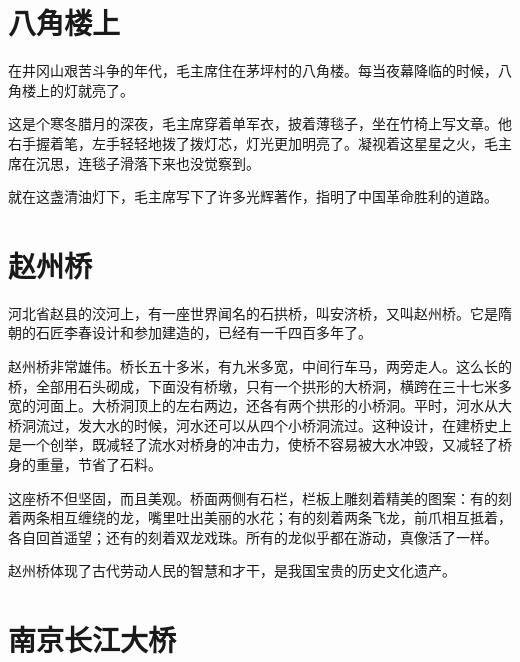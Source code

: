 \documentclass[12pt,UTF-8,openany]{ctexbook}
\begin{document}
\chapter{八角楼上}

\begin{large}
    
    在井冈山艰苦斗争的年代，毛主席住在茅坪村的八角楼。每当夜幕降临的时候，八角楼上的灯就亮了。
    
    这是个寒冬腊月的深夜，毛主席穿着单军衣，披着薄毯子，坐在竹椅上写文章。他右手握着笔，左手轻轻地拨了拨灯芯，灯光更加明亮了。凝视着这星星之火，毛主席在沉思，连毯子滑落下来也没觉察到。
    
    就在这盏清油灯下，毛主席写下了许多光辉著作，指明了中国革命胜利的道路。
    
\end{large}



\chapter{赵州桥}

\begin{large}
    
    河北省赵县的洨河上，有一座世界闻名的石拱桥，叫安济桥，又叫赵州桥。它是隋朝的石匠李春设计和参加建造的，已经有一千四百多年了。
    
    赵州桥非常雄伟。桥长五十多米，有九米多宽，中间行车马，两旁走人。这么长的桥，全部用石头砌成，下面没有桥墩，只有一个拱形的大桥洞，横跨在三十七米多宽的河面上。大桥洞顶上的左右两边，还各有两个拱形的小桥洞。平时，河水从大桥洞流过，发大水的时候，河水还可以从四个小桥洞流过。这种设计，在建桥史上是一个创举，既减轻了流水对桥身的冲击力，使桥不容易被大水冲毁，又减轻了桥身的重量，节省了石料。
    
    这座桥不但坚固，而且美观。桥面两侧有石栏，栏板上雕刻着精美的图案：有的刻着两条相互缠绕的龙，嘴里吐出美丽的水花；有的刻着两条飞龙，前爪相互抵着，各自回首遥望；还有的刻着双龙戏珠。所有的龙似乎都在游动，真像活了一样。
    
    赵州桥体现了古代劳动人民的智慧和才干，是我国宝贵的历史文化遗产。
    
\end{large}



\chapter{南京长江大桥}
\end{document}
